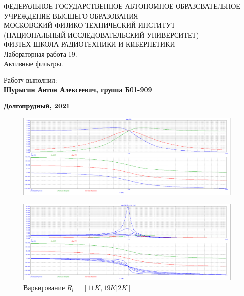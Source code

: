 \documentclass[15pt,a5paper,reqno]{article}
\begin{document}
\begin{center}
  {\small ФЕДЕРАЛЬНОЕ ГОСУДАРСТВЕННОЕ АВТОНОМНОЕ ОБРАЗОВАТЕЛЬНОЕ\\ УЧРЕЖДЕНИЕ ВЫСШЕГО ОБРАЗОВАНИЯ\\ МОСКОВСКИЙ ФИЗИКО-ТЕХНИЧЕСКИЙ ИНСТИТУТ\\ (НАЦИОНАЛЬНЫЙ ИССЛЕДОВАТЕЛЬСКИЙ УНИВЕРСИТЕТ)\\ ФИЗТЕХ-ШКОЛА РАДИОТЕХНИКИ И КИБЕРНЕТИКИ}\\
  \hfill \break
  \hfill \break
  \hfill \break
  \Huge{Лабораторная работа 19. \\ Активные фильтры.}\\
\end{center}

\hfill \break
\hfill \break
\hfill \break
\hfill \break
\hfill \break
\hfill \break

\begin{flushright}
  \normalsize{Работу выполнил:}\\
  \normalsize{\textbf{Шурыгин Антон Алексеевич, группа Б01-909}}\\
\end{flushright}

\begin{center}
  \normalsize{\textbf{Долгопрудный, 2021}}
\end{center}


\thispagestyle{empty} %


\newpage
\thispagestyle{plain}
\tableofcontents
\thispagestyle{plain}
\newpage



\begin{figure}[h!]
    \centering
    \includegraphics[width=12cm]{pics/point4.png}
    \caption{}
    \label{Задание 4 пункт 1. частотные характеристики фнч фвч и пф}
\end{figure}



\begin{figure}[h!]
    \centering
    \includegraphics[width=12cm]{pics/point4_1_var1.png}
    \caption{Варьирование $R_l = [11K, 19K | 2K]$}
    \label{}
\end{figure}
\end{document}
